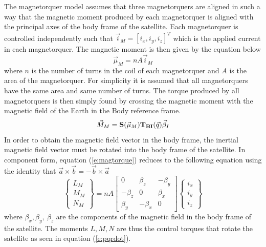 \documentclass{article}
\begin{document}
The magnetorquer model assumes that three magnetorquers are aligned in
such a way that the magnetic moment produced by each magnetorquer is
aligned with the principal axes of the body frame of the
satellite. Each magnetorquer is controlled independently such that
$\vec{i}_M = [i_x,i_y,i_z]^T$ which is the applied current in each
magnetorquer. The magnetic moment is then given by the equation below 
\begin{equation}\label{e:magmoment}
  \vec{\mu}_M = nA\vec{i}_M
\end{equation}
where $n$ is the number of turns in the coil 
of each magnetorquer and $A$ is the area of the magnetorquer. For
simplicity it is assumed that all magnetorquers have the same area and
same number of turns. The torque produced by all magnetorquers is then
simply found by crossing the magnetic moment with the magnetic field
of the Earth in the Body reference frame.
\begin{equation}\label{e:magtorque}
  \vec{M}_M = {\bf S}(\vec{\mu}_M){\bf T_{BI}}(\vec{q})\vec{\beta}_I
\end{equation}
In order to obtain the magnetic field vector in the body frame, the
inertial magnetic field vector must be rotated into the body frame of
the satellite. In component form, equation (\ref{e:magtorque}) reduces to the following
equation using the identity that $\vec{a}\times\vec{b}=-\vec{b}\times\vec{a}$
\begin{equation}\label{e:magtorquecomponent}
  \begin{Bmatrix} L_M \\ M_M \\ N_M \end{Bmatrix} = nA\begin{bmatrix} 0 & \beta_z & -\beta_y \\ -\beta_z & 0 &
  \beta_x \\ \beta_y & -\beta_x & 0 \end{bmatrix}\begin{Bmatrix} i_{x}
    \\ i_{y} \\ i_{z} \end{Bmatrix}
\end{equation}
where $\beta_x,\beta_y,~\beta_z$ are the components of the magnetic
field in the body frame of the satellite. The moments $L,M,N$ are thus
the control torques that rotate the satellite as seen in equation
(\ref{e:pqrdot}).
\end{document}
